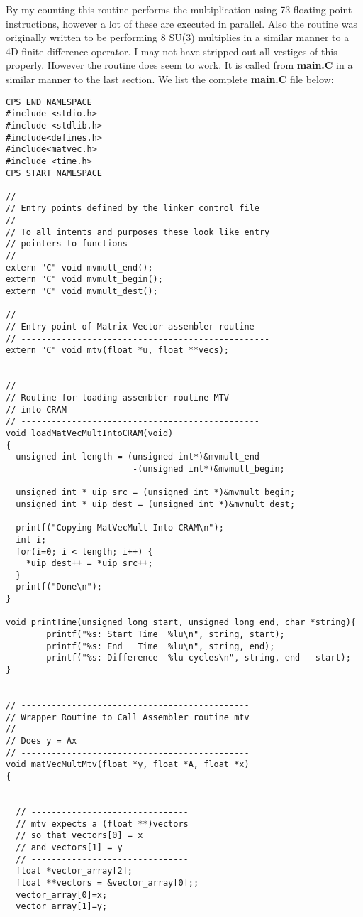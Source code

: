By my counting this routine performs the multiplication using 73 floating
point instructions, however a lot of these are executed in parallel. Also
the routine was originally written to be performing 8 SU(3) multiplies
in a similar manner to a 4D finite difference operator. I may not have
stripped out all vestiges of this properly. However the routine does
seem to work. It is called from {\bf main.C} in a similar manner to the 
last section. We list the complete {\bf main.C} file below:
{\scriptsize
\begin{verbatim}
CPS_END_NAMESPACE
#include <stdio.h>
#include <stdlib.h>
#include<defines.h>
#include<matvec.h>
#include <time.h>
CPS_START_NAMESPACE

// ------------------------------------------------
// Entry points defined by the linker control file
//
// To all intents and purposes these look like entry
// pointers to functions
// ------------------------------------------------
extern "C" void mvmult_end();
extern "C" void mvmult_begin();
extern "C" void mvmult_dest();

// -------------------------------------------------
// Entry point of Matrix Vector assembler routine
// -------------------------------------------------
extern "C" void mtv(float *u, float **vecs);


// -----------------------------------------------
// Routine for loading assembler routine MTV
// into CRAM
// -----------------------------------------------
void loadMatVecMultIntoCRAM(void)
{
  unsigned int length = (unsigned int*)&mvmult_end
                         -(unsigned int*)&mvmult_begin;

  unsigned int * uip_src = (unsigned int *)&mvmult_begin;
  unsigned int * uip_dest = (unsigned int *)&mvmult_dest;

  printf("Copying MatVecMult Into CRAM\n");
  int i;
  for(i=0; i < length; i++) {
    *uip_dest++ = *uip_src++;
  }
  printf("Done\n");
}

void printTime(unsigned long start, unsigned long end, char *string){
        printf("%s: Start Time  %lu\n", string, start);
        printf("%s: End   Time  %lu\n", string, end);
        printf("%s: Difference  %lu cycles\n", string, end - start);
} 


// ---------------------------------------------
// Wrapper Routine to Call Assembler routine mtv
// 
// Does y = Ax
// ---------------------------------------------
void matVecMultMtv(float *y, float *A, float *x)
{


  // -------------------------------
  // mtv expects a (float **)vectors
  // so that vectors[0] = x
  // and vectors[1] = y
  // -------------------------------
  float *vector_array[2];
  float **vectors = &vector_array[0];;
  vector_array[0]=x;
  vector_array[1]=y;


\end{verbatim}}
